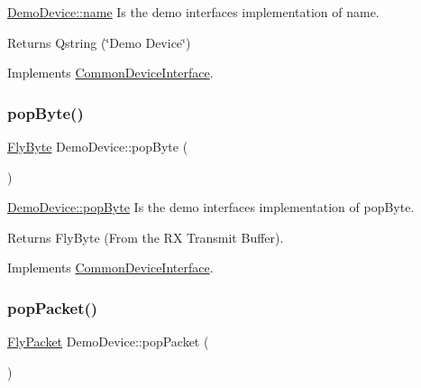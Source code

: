 \hyperlink{class_demo_device_acde538bd5a71a8d4df6293876169545c}{Demo\+Device\+::name} Is the demo interface\textquotesingle{}s implementation of name. 

\begin{DoxyReturn}{Returns}
Qstring (\char`\"{}\+Demo Device\char`\"{}) 
\end{DoxyReturn}


Implements \hyperlink{class_common_device_interface_a3d80b22eafc88af3109b08491bef6e8a}{Common\+Device\+Interface}.

\hypertarget{class_demo_device_a788dd7e426fab9c8d19ea9fd106260d4}{}\label{class_demo_device_a788dd7e426fab9c8d19ea9fd106260d4} 
\subsubsection{\texorpdfstring{pop\+Byte()}{popByte()}}
{\footnotesize\ttfamily \hyperlink{conversions_8h_a1f006e31a957accfe6aa1bf6f401efce}{Fly\+Byte} Demo\+Device\+::pop\+Byte (\begin{DoxyParamCaption}{ }\end{DoxyParamCaption})\hspace{0.3cm}{\ttfamily [virtual]}}



\hyperlink{class_demo_device_a788dd7e426fab9c8d19ea9fd106260d4}{Demo\+Device\+::pop\+Byte} Is the demo interface\textquotesingle{}s implementation of pop\+Byte. 

\begin{DoxyReturn}{Returns}
Fly\+Byte (From the RX Transmit Buffer). 
\end{DoxyReturn}


Implements \hyperlink{class_common_device_interface_ab9f57b21f72ebfbf79c86f8d0e4f0654}{Common\+Device\+Interface}.

\hypertarget{class_demo_device_a6e755f50f52301b9166e278fe6851e88}{}\label{class_demo_device_a6e755f50f52301b9166e278fe6851e88} 
\subsubsection{\texorpdfstring{pop\+Packet()}{popPacket()}}
{\footnotesize\ttfamily \hyperlink{class_fly_packet}{Fly\+Packet} Demo\+Device\+::pop\+Packet (\begin{DoxyParamCaption}{ }\end{DoxyParamCaption})\hspace{0.3cm}{\ttfamily [virtual]}}




